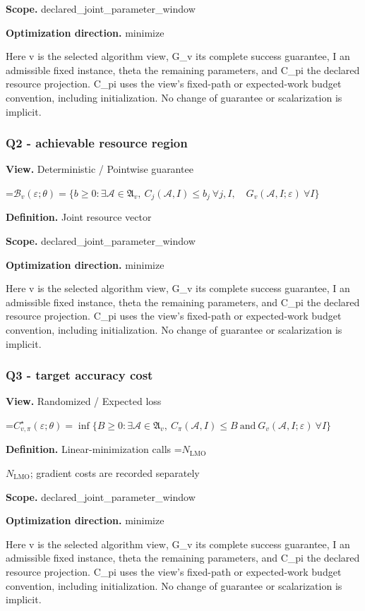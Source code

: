\documentclass[10pt,a4paper]{article}
\newcommand{\AtlasMath}[1]{\par\begingroup\centering\setbox0=\hbox{$\displaystyle #1$}\ifdim\wd0>1.4\linewidth\typeout{ATLAS WIDE FORMULA: \the\wd0}\fi\ifdim\wd0>\linewidth\resizebox{\linewidth}{!}{\box0}\else\box0\fi\par\endgroup}
\newcommand{\AtlasInlineMath}[1]{\begingroup\setbox0=\hbox{$#1$}\ifdim\wd0>.4\linewidth\endgroup\AtlasMath{#1}\else\endgroup$#1$\fi}
\begin{document}
\textbf{Scope.} declared\_joint\_parameter\_window

\textbf{Optimization direction.} minimize

Here v is the selected algorithm view, G\_v its complete success guarantee, I an admissible fixed instance, theta the remaining parameters, and C\_pi the declared resource projection. C\_pi uses the view's fixed-path or expected-work budget convention, including initialization. No change of guarantee or scalarization is implicit.

\subsubsection{Q2 - achievable resource region}
\textbf{View.} Deterministic / Pointwise guarantee

\AtlasMath{\mathcal B_v(\varepsilon;\theta)=\{b\ge0:\exists\mathcal A\in\mathfrak A_v,\ C_j(\mathcal A,I)\le b_j\ \forall j,I,\quad G_v(\mathcal A,I;\varepsilon)\ \forall I\}}
\textbf{Definition.} Joint resource vector

\textbf{Scope.} declared\_joint\_parameter\_window

\textbf{Optimization direction.} minimize

Here v is the selected algorithm view, G\_v its complete success guarantee, I an admissible fixed instance, theta the remaining parameters, and C\_pi the declared resource projection. C\_pi uses the view's fixed-path or expected-work budget convention, including initialization. No change of guarantee or scalarization is implicit.

\subsubsection{Q3 - target accuracy cost}
\textbf{View.} Randomized / Expected loss

\AtlasMath{C^\star_{v,\pi}(\varepsilon;\theta)=\inf\{B\ge0:\exists\mathcal A\in\mathfrak A_v,\ C_\pi(\mathcal A,I)\le B\ \text{and}\ G_v(\mathcal A,I;\varepsilon)\ \forall I\}}
\textbf{Definition.} Linear-minimization calls \AtlasInlineMath{N_{\mathrm{LMO}}}; gradient costs are recorded separately

\textbf{Scope.} declared\_joint\_parameter\_window

\textbf{Optimization direction.} minimize

Here v is the selected algorithm view, G\_v its complete success guarantee, I an admissible fixed instance, theta the remaining parameters, and C\_pi the declared resource projection. C\_pi uses the view's fixed-path or expected-work budget convention, including initialization. No change of guarantee or scalarization is implicit.
\end{document}

